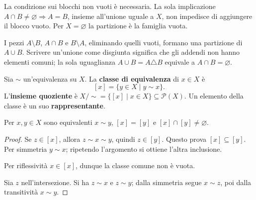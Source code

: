 \begin{osservazione}
La condizione sui blocchi non vuoti è necessaria. La sola implicazione $A\cap B\ne\varnothing\Rightarrow A=B$, insieme all'unione uguale a $X$, non impedisce di aggiungere il blocco vuoto. Per $X=\varnothing$ la partizione è la famiglia vuota.
\end{osservazione}

\begin{esempio}
I pezzi $A\setminus B$, $A\cap B$ e $B\setminus A$, eliminando quelli vuoti, formano una partizione di $A\cup B$. Scrivere un'unione come disgiunta significa che gli addendi non hanno elementi comuni; la sola uguaglianza $A\cup B=A\triangle B$ equivale a $A\cap B=\varnothing$.
\end{esempio}

\begin{definizione}
Sia $\sim$ un'equivalenza su $X$. La \textbf{classe di equivalenza} di $x\in X$ è
\[
[x]=\{y\in X\mid y\sim x\}.
\]
L'\textbf{insieme quoziente} è $X/{\sim}=\{[x]\mid x\in X\}\subseteq\mathcal P(X)$. Un elemento della classe è un suo \textbf{rappresentante}.
\end{definizione}

\begin{proposizione}\label{prop:classi}
Per $x,y\in X$ sono equivalenti $x\sim y$, $[x]=[y]$ e $[x]\cap[y]\ne\varnothing$.
\end{proposizione}
\begin{proof}
 Se $z\in[x]$, allora $z\sim x\sim y$, quindi $z\in[y]$. Questo prova $[x]\subseteq[y]$. Per simmetria $y\sim x$; ripetendo l'argomento si ottiene l'altra inclusione.

\passomath{[x]=[y]\Rightarrow[x]\cap[y]\ne\varnothing} Per riflessività $x\in[x]$, dunque la classe comune non è vuota.

 Sia $z$ nell'intersezione. Si ha $z\sim x$ e $z\sim y$; dalla simmetria segue $x\sim z$, poi dalla transitività $x\sim y$.
\end{proof}

